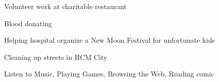 \documentclass[a4paper,12pt]{memoir} %
\begin{document}

\Sep %





\bluebullet Volunteer work at charitable restaurant

\bluebullet Blood donating

\bluebullet Helping hospital organize a New Moon Festival for unfortunate kids

\bluebullet Cleaning up streets in HCM City


\Sep %



Listen to Music, Playing Games, Browsing the Web, Reading comic


\Sep %

\end{document}
